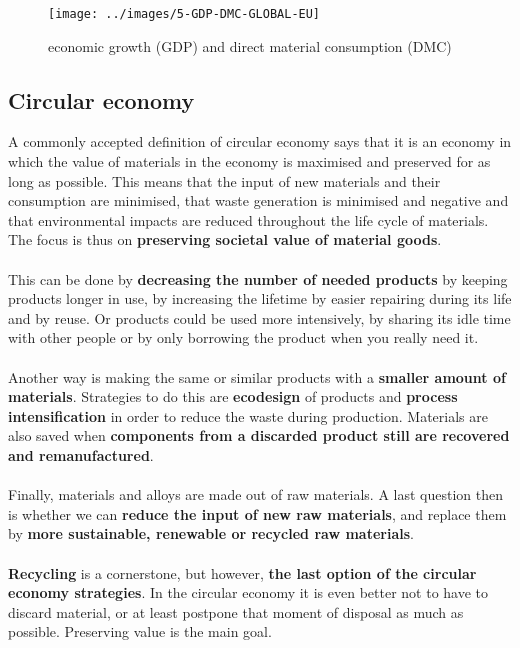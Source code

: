 \documentclass[../summary.tex]{subfiles}
\begin{document}
	\begin{figure}[H]
		\centering
		\texttt{[image: ../images/5-GDP-DMC-GLOBAL-EU]}
		\caption{economic growth (GDP) and direct material consumption (DMC)}
		\label{fig:5-gdp-dmc-global-eu}
	\end{figure}
	
	\newpage
	\subsection{Circular economy}
	
	A commonly accepted definition of circular economy says that it is an economy in which the value of materials in the economy is maximised and preserved for as long as possible. This means that the input of new materials and their consumption are minimised, that waste generation is minimised and negative and that environmental impacts are reduced throughout the life cycle of materials. The focus is thus on \textbf{preserving societal value of material goods}.
	\\\\
	This can be done by \textbf{decreasing the number of needed products} by keeping products longer in use, by increasing the lifetime by easier repairing during its life and by reuse. Or products could be used more intensively, by sharing its idle time with other people or by only borrowing the product when you really need it.
	\\\\
	Another way is making the same or similar products with a \textbf{smaller amount of materials}. Strategies to do this are \textbf{ecodesign} of products and \textbf{process intensification} in order to reduce the waste during production. Materials are also saved when \textbf{components from a discarded product still are recovered and remanufactured}.
	\\\\
	Finally, materials and alloys are made out of raw materials. A last question then is whether we can \textbf{reduce the input of new raw materials}, and replace them by \textbf{more sustainable, renewable or recycled raw materials}. 
	\\\\
	\textbf{Recycling} is a cornerstone, but however, \textbf{the last option of the circular economy strategies}. In the circular economy it is even better not to have to discard material, or at least postpone that moment of disposal as much as possible. Preserving value is the main goal.
\end{document}
